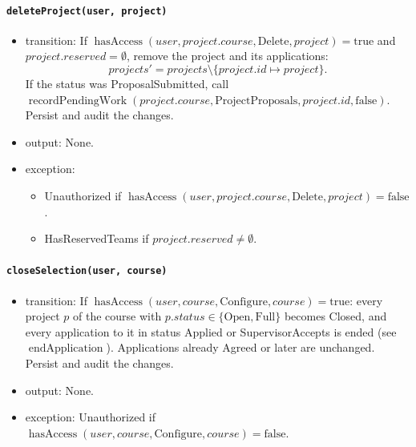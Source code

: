 \documentclass[12pt, titlepage]{article}
\begin{document}
\paragraph{\texttt{deleteProject(user, project)}}
\begin{itemize}
    \item transition: If $\operatorname{hasAccess}(user,project.course,\text{Delete},project)=\text{true}$ and $project.reserved=\emptyset$, remove the project and its applications:
    \[
    \mathit{projects}'=\mathit{projects}\setminus\{project.id\mapsto project\}.
    \]
    If the status was ProposalSubmitted, call $\operatorname{recordPendingWork}(project.course,\text{ProjectProposals},project.id,\text{false})$. Persist and audit the changes.
    \item output: None.
    \item exception:
    \begin{itemize}
        \item Unauthorized if $\operatorname{hasAccess}(user,project.course,\text{Delete},project)=\text{false}$.
        \item HasReservedTeams if $project.reserved\ne\emptyset$.
    \end{itemize}
\end{itemize}

\paragraph{\texttt{closeSelection(user, course)}}
\begin{itemize}
    \item transition: If $\operatorname{hasAccess}(user,course,\text{Configure},course)=\text{true}$: every project $p$ of the course with $p.status\in\{\text{Open},\text{Full}\}$ becomes Closed, and every application to it in status Applied or SupervisorAccepts is ended (see $\operatorname{endApplication}$). Applications already Agreed or later are unchanged. Persist and audit the changes.
    \item output: None.
    \item exception: Unauthorized if $\operatorname{hasAccess}(user,course,\text{Configure},course)=\text{false}$.
\end{itemize}
\end{document}
